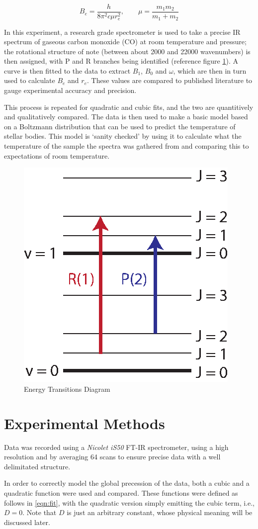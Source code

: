 \documentclass[aps,prl,reprint,10pt,amsmath,amssymb,superscriptaddress,a4paper]{revtex4-2}
\begin{document}
\begin{equation}
\label{eqn:B}
B_e = \frac{h}{8 \pi^2 c \mu r_e^2}, \qquad \mu = \frac{m_1 m_2}{m_1 + m_2} 
\end{equation}

In this experiment, a research grade spectrometer is used to take a precise IR spectrum of gaseous carbon monoxide (CO) at room temperature and pressure; the rotational structure of note (between about 2000 and 22000 wavenumbers) is then assigned, with P and R branches being identified (reference figure \ref{fig:transitions}). A curve is then fitted to the data to extract $B_1$, $B_0$ and $\omega$, which are then in turn used to calculate $B_e$ and $r_e$. These values are compared to published literature to gauge experimental accuracy and precision.

This process is repeated for quadratic and cubic fits, and the two are quantitively and qualitatively compared. The data is then used to make a basic model based on a Boltzmann distribution that can be used to predict the temperature of stellar bodies. This model is ‘sanity checked’ by using it to calculate what the temperature of the sample the spectra was gathered from and comparing this to expectations of room temperature.

\begin{figure}[t]
\includegraphics[width = 5 cm]{Transitions.eps}
\caption{Energy Transitions Diagram}
\label{fig:transitions}
\end{figure}

\section{Experimental Methods}

Data was recorded using a {\it Nicolet iS50} FT-IR spectrometer, using a high resolution and by averaging 64 scans to ensure precise data with a well delimitated structure.

In order to correctly model the global precession of the data, both a cubic and a quadratic function were used and compared. These functions were defined as follows in \ref{eqn:fit}, with the quadratic version simply emitting the cubic term, i.e., $ D = 0$. Note that $D$ is just an arbitrary constant, whose physical meaning will be discussed later.
\end{document}
